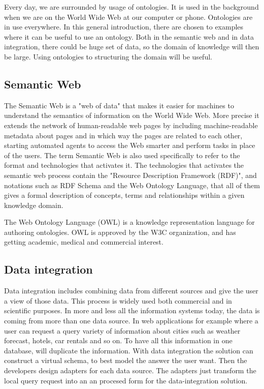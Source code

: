 Every day, we are surrounded by usage of ontologies. It is used in the background when we are on the World Wide Web at our computer or phone. Ontologies are in use everywhere. In this general introduction, there are chosen to examples where it can be useful to use an ontology. Both in the semantic web and in data integration, there could be huge set of data, so the domain of knowledge will then be large. Using ontologies to structuring the domain will be useful.

\subsection{Semantic Web}
The Semantic Web is a "web of data" that makes it easier for machines to understand the semantics of information on the World Wide Web. More precise it extends the network of human-readable web pages by including machine-readable metadata about pages and in which way the pages are related to each other, starting automated agents to access the Web smarter and perform tasks in place of the users. The term Semantic Web is also used specifically to refer to the format and technologies that activates it. The technologies that activates the semantic web process contain the "Resource Description Framework (RDF)", and notations such as RDF Schema and the Web Ontology Language, that all of them gives a formal description of concepts, terms and relationships within a given knowledge domain.\cite{website:wikipediasemanticweb}

The Web Ontology Language (OWL) is a knowledge representation language for authoring ontologies. OWL is approved by the W3C organization, and has getting academic, medical and commercial interest.

\subsection{Data integration}
Data integration includes combining data from different sources and give the user a view of those data. This process is widely used both commercial and in scientific purposes. In more and less all the information systems today, the data is coming from more than one data source. In web applications for example where a user can request a query variety  of information about cities such as weather forecast, hotels, car rentals and so on. To have all this information in one database, will duplicate the information. With data integration the solution can construct a virtual schema, to best model the answer the user want. Then the developers design adapters for each data source. The adapters just transform the local query request into  an an procesed form for the data-integration solution. \cite{website:wikipediadataintegration}

